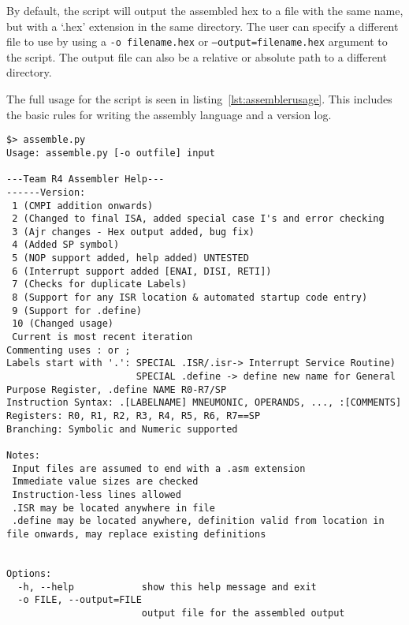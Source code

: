 By default, the script will output the assembled hex to a file with the same name, but with a `.hex' extension in the same directory.
The user can specify a different file to use by using a \texttt{-o filename.hex} or \texttt{--output=filename.hex} argument to the script.
The output file can also be a relative or absolute path to a different directory. 

The full usage for the script is seen in listing~\ref{lst:assemblerusage}. 
This includes the basic rules for writing the assembly language and a version log. 

\begin{lstlisting}[label=lst:assemblerusage,caption={Assembler help prompt}]
$> assemble.py 
Usage: assemble.py [-o outfile] input

---Team R4 Assembler Help---
------Version: 
 1 (CMPI addition onwards)
 2 (Changed to final ISA, added special case I's and error checking
 3 (Ajr changes - Hex output added, bug fix)
 4 (Added SP symbol)
 5 (NOP support added, help added) UNTESTED
 6 (Interrupt support added [ENAI, DISI, RETI])
 7 (Checks for duplicate Labels)
 8 (Support for any ISR location & automated startup code entry)
 9 (Support for .define)
 10 (Changed usage)
 Current is most recent iteration
Commenting uses : or ;
Labels start with '.': SPECIAL .ISR/.isr-> Interrupt Service Routine)
                       SPECIAL .define -> define new name for General Purpose Register, .define NAME R0-R7/SP
Instruction Syntax: .[LABELNAME] MNEUMONIC, OPERANDS, ..., :[COMMENTS]
Registers: R0, R1, R2, R3, R4, R5, R6, R7==SP
Branching: Symbolic and Numeric supported

Notes:
 Input files are assumed to end with a .asm extension
 Immediate value sizes are checked
 Instruction-less lines allowed
 .ISR may be located anywhere in file
 .define may be located anywhere, definition valid from location in file onwards, may replace existing definitions


Options:
  -h, --help            show this help message and exit
  -o FILE, --output=FILE
                        output file for the assembled output

\end{lstlisting}

\newpage
